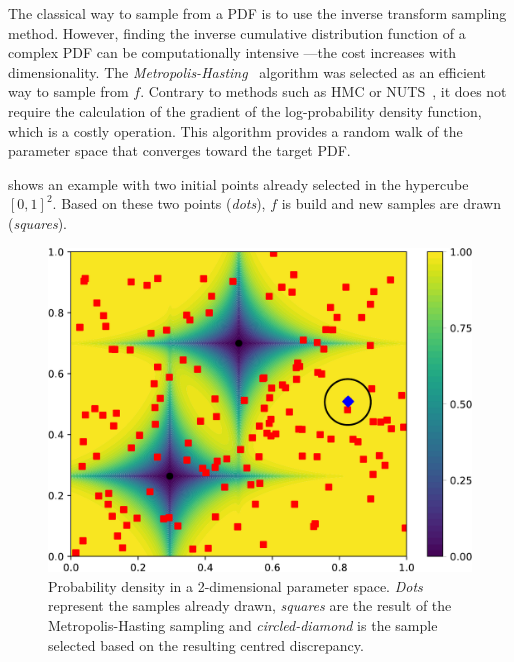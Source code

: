 
The classical way to sample from a PDF is to use the inverse transform sampling method. However, finding the inverse cumulative distribution function of a complex PDF can be computationally intensive ---\thinspace the cost increases with dimensionality. The \emph{Metropolis-Hasting}~\citep{Hastings1979} algorithm was selected as an efficient way to sample from $f$. Contrary to methods such as HMC or NUTS~\citep{Hoffman2011}, it does not require the calculation of the gradient of the log-probability density function, which is a costly operation. This algorithm provides a random walk of the parameter space that converges toward the target PDF.



 shows an example with two initial points already selected in the hypercube $[0, 1]^2$. Based on these two points (\emph{dots}), $f$ is build and new samples are drawn (\emph{squares}).

\begin{figure}[!ht]
\centering
\includegraphics[width=0.8\linewidth,keepaspectratio]{fig/contributions/doe/sampling_KDE.pdf}
\caption{Probability density in a 2-dimensional parameter space. \emph{Dots} represent the samples already drawn, \emph{squares} are the result of the Metropolis-Hasting sampling and \emph{circled-diamond} is the sample selected based on the resulting centred discrepancy.}
\label{fig:sample_kde}
\end{figure}

